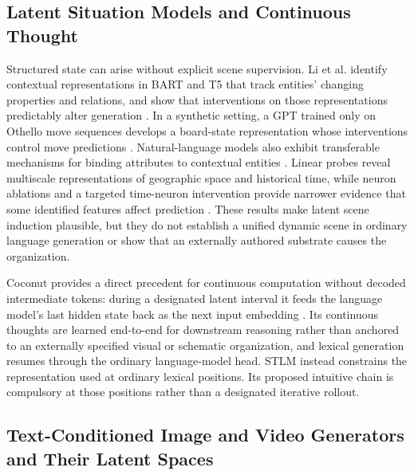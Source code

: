 \documentclass[11pt,a4paper]{article}
\begin{document}
\subsection{Latent Situation Models and Continuous Thought}

Structured state can arise without explicit scene supervision. Li et al. identify contextual representations in BART and T5 that track entities' changing properties and relations, and show that interventions on those representations predictably alter generation \cite{implicitmeaning2021}. In a synthetic setting, a GPT trained only on Othello move sequences develops a board-state representation whose interventions control move predictions \cite{othelloworld2023}. Natural-language models also exhibit transferable mechanisms for binding attributes to contextual entities \cite{feng2024binding}. Linear probes reveal multiscale representations of geographic space and historical time, while neuron ablations and a targeted time-neuron intervention provide narrower evidence that some identified features affect prediction \cite{gurnee2024spacetime}. These results make latent scene induction plausible, but they do not establish a unified dynamic scene in ordinary language generation or show that an externally authored substrate causes the organization.

Coconut provides a direct precedent for continuous computation without decoded intermediate tokens: during a designated latent interval it feeds the language model's last hidden state back as the next input embedding \cite{coconut2025}. Its continuous thoughts are learned end-to-end for downstream reasoning rather than anchored to an externally specified visual or schematic organization, and lexical generation resumes through the ordinary language-model head. STLM instead constrains the representation used at ordinary lexical positions. Its proposed intuitive chain is compulsory at those positions rather than a designated iterative rollout.

\subsection{Text-Conditioned Image and Video Generators and Their Latent Spaces}
\end{document}
